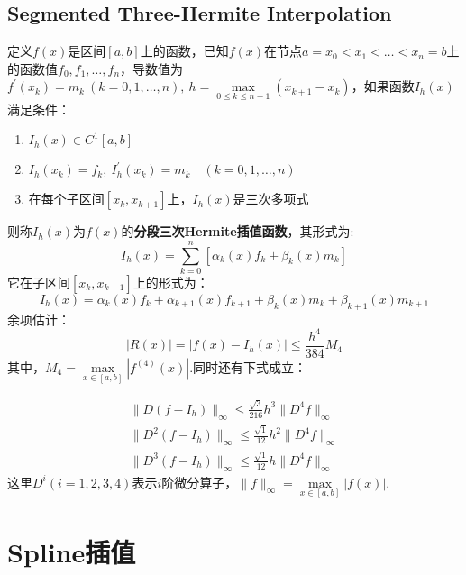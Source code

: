 \subsection{Segmented Three-Hermite Interpolation}
定义$f(x)$是区间$[a,b]$上的函数，已知$f(x)$在节点$a=x_0<x_1<\dots <x_n=b$上的函数值$f_0,f_1,\dots,f_n$，导数值为$f^{\prime}(x_k)=m_k\ (k=0,1,\dots,n),\ h=\max\limits_{0\leqslant k\leqslant n-1}(x_{k+1}-x_k)$，如果函数$I_h(x)$满足条件：
\begin{enumerate}
	\item $I_h(x) \in C^1[a,b]$
	\item $I_h(x_k) = f_k,\ I_h^{\prime}(x_k) = m_k\quad (k=0,1,\dots,n)$
	\item 在每个子区间$[x_k,x_{k+1}]$上，$I_h(x)$是三次多项式
\end{enumerate}
则称$I_h(x)$为$f(x)$的\textbf{分段三次Hermite插值函数}，其形式为:
\begin{equation}
I_h(x) = \sum\limits_{k=0}^n [\alpha_k(x)f_k + \beta_k(x)m_k]
\end{equation}
它在子区间$[x_k,x_{k+1}]$上的形式为：
\begin{equation}
I_h(x) = \alpha_k(x)f_k + \alpha_{k+1}(x)f_{k+1} + \beta_k(x)m_k + \beta_{k+1}(x)m_{k+1}
\end{equation}
余项估计：
\begin{equation}
\left| R(x)\right| = \left| f(x) - I_h(x) \right| \leqslant \frac{h^4}{384}M_4
\end{equation}
其中，$M_4 = \max\limits_{x\in [a,b]}\left| f^{(4)}(x)\right|$.同时还有下式成立：
\begin{theorem}
	\begin{align}
	\| D(f-I_h)\|_\infty \leqslant \frac{\sqrt{3}}{216}h^3\|D^4f\|_\infty 
	\\[4mm]
	\| D^2(f-I_h)\|_\infty \leqslant \frac{\sqrt{1}}{12}h^2\|D^4f\|_\infty 
	\\[4mm]
	\| D^3(f-I_h)\|_\infty \leqslant \frac{\sqrt{1}}{12}h\|D^4f\|_\infty
	\end{align}
这里$D^i(i=1,2,3,4)$表示$i$阶微分算子，$\|f\|_\infty = \max\limits_{x\in[a,b]}\left| f(x)\right|$.
\end{theorem}


\newpage
\section{Spline插值}

